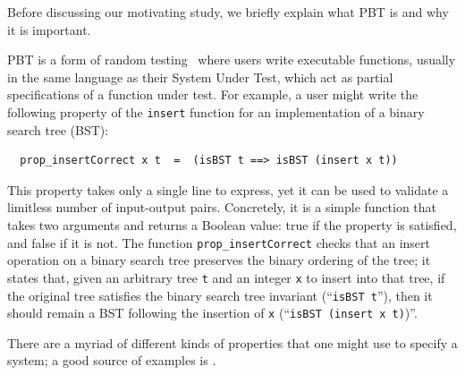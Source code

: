 %


Before discussing our motivating study, we briefly explain what PBT is
and why it is important.

PBT is a form of random testing~\cite{hamlet1994random} where
users write executable functions, usually in the same language as
their System Under Test, which act as partial
specifications of a function under test. For example, a user might
write the following property of the \lstinline{insert}
function for an implementation of a binary search tree (BST):
\begin{lstlisting}
  prop_insertCorrect x t  =  (isBST t ==> isBST (insert x t))
\end{lstlisting}
This property takes only a single
line to express, yet it can be used to validate a limitless number of
input-output pairs. Concretely, it is
a simple function that takes two arguments and returns a
Boolean value: true if the property is satisfied, and false if it is
not. The function \texttt{prop\_insertCorrect} checks
that an insert operation on a binary search tree preserves the
binary ordering of the tree; it states
that, given an arbitrary tree \texttt{t} and an integer
\texttt{x} to insert into that tree, if the original tree
satisfies the
binary search tree invariant (``\texttt{isBST t}''), then it should remain
a BST following the insertion of \texttt{x} (``\texttt{isBST (insert x t)})''.

\iflater {}There are a
myriad of different kinds of properties that one might use to specify
a system; a good source of examples is \citet{HowToSpecifyIt}.  \fi


